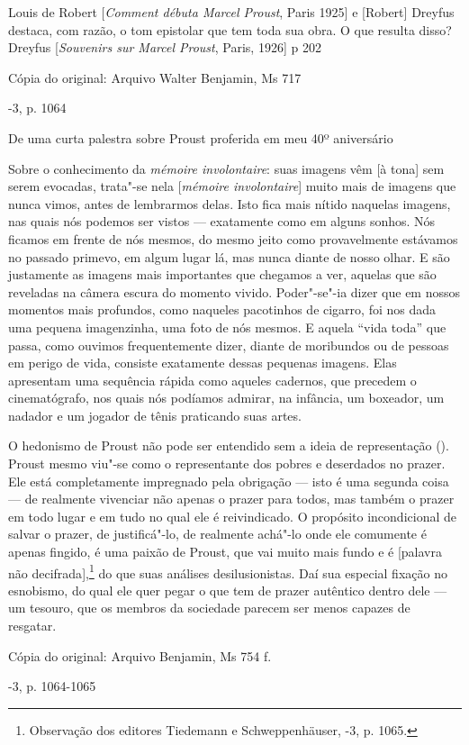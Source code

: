 Louis de Robert {[}\emph{Comment débuta Marcel Proust}, Paris 1925{]} e
{[}Robert{]} Dreyfus destaca, com razão, o tom epistolar que tem toda
sua obra. O que resulta disso? Dreyfus {[}\emph{Souvenirs sur Marcel
Proust}, Paris, 1926{]} p 202

Cópia do original: Arquivo Walter Benjamin, Ms 717

-3, p. 1064

De uma curta palestra sobre Proust proferida em meu 40º aniversário

Sobre o conhecimento da \emph{mémoire involontaire}: suas imagens vêm
{[}à tona{]} sem serem evocadas, trata"-se nela {[}\emph{mémoire
involontaire}{]} muito mais de imagens que nunca vimos, antes de
lembrarmos delas. Isto fica mais nítido naquelas imagens, nas quais nós
podemos ser vistos --- exatamente como em alguns sonhos. Nós ficamos em
frente de nós mesmos, do mesmo jeito como provavelmente estávamos no
passado primevo, em algum lugar lá, mas nunca diante de nosso olhar. E
são justamente as imagens mais importantes que chegamos a ver, aquelas
que são reveladas na câmera escura do momento vivido. Poder"-se"-ia dizer
que em nossos momentos mais profundos, como naqueles pacotinhos de
cigarro, foi nos dada uma pequena imagenzinha, uma foto de nós mesmos. E
aquela ``vida toda'' que passa, como ouvimos frequentemente dizer,
diante de moribundos ou de pessoas em perigo de vida, consiste
exatamente dessas pequenas imagens. Elas apresentam uma sequência rápida
como aqueles cadernos, que precedem o cinematógrafo, nos quais nós
podíamos admirar, na infância, um boxeador, um nadador e um jogador de
tênis praticando suas artes.

O hedonismo de Proust não pode ser entendido sem a ideia de
representação (). Proust mesmo viu"-se como o representante dos pobres e
deserdados no prazer. Ele está completamente impregnado pela obrigação
--- isto é uma segunda coisa --- de realmente vivenciar não apenas o
prazer para todos, mas também o prazer em todo lugar e em tudo no qual
ele é reivindicado. O propósito incondicional de salvar o prazer, de
justificá"-lo, de realmente achá"-lo onde ele comumente é apenas fingido,
é uma paixão de Proust, que vai muito mais fundo e é {[}palavra não
decifrada{]},\footnote{Observação dos editores Tiedemann e
  Schweppenhäuser, -3, p. 1065. \versal{[N. E.]}} do que suas análises
desilusionistas. Daí sua especial fixação no esnobismo, do qual ele quer
pegar o que tem de prazer autêntico dentro dele --- um tesouro, que os
membros da sociedade parecem ser menos capazes de resgatar.

Cópia do original: Arquivo Benjamin, Ms 754 f.

-3, p. 1064-1065

